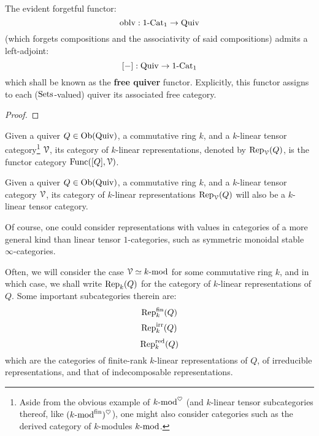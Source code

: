            \begin{proposition} \label{prop: free_quivers}
                The evident forgetful functor:
                    $$\oblv: 1\-\Cat_1 \to \Quiv$$
                (which forgets compositions and the associativity of said compositions) admits a left-adjoint:
                    $$[-]: \Quiv \to 1\-\Cat_1$$
                which shall be known as the \textbf{free quiver} functor. Explicitly, this functor assigns to each ($\Sets$-valued) quiver its associated free category.
            \end{proposition}
                \begin{proof}
                    
                \end{proof}
            \begin{definition} \label{def: quiver_representations}
                Given a quiver $Q \in \Ob(\Quiv)$, a commutative ring $k$, and a $k$-linear tensor category\footnote{Aside from the obvious example of $k\mod^{\heart}$ (and $k$-linear tensor subcategories thereof, like $(k\mod^{\fin})^{\heart}$), one might also consider categories such as the derived category of $k$-modules $k\mod$.} $\calV$, its category of $k$-linear representations, denoted by $\Rep_{\calV}(Q)$, is the functor category $\Func([Q], \calV)$.
            \end{definition}
            \begin{remark}
                Given a quiver $Q \in \Ob(\Quiv)$, a commutative ring $k$, and a $k$-linear tensor category $\calV$, its category of $k$-linear representations $\Rep_{\calV}(Q)$ will also be a $k$-linear tensor category.
                
                Of course, one could consider representations with values in categories of a more general kind than linear tensor $1$-categories, such as symmetric monoidal stable $\infty$-categories. 
            \end{remark}
            \begin{convention}
                Often, we will consider the case $\calV \cong k\mod$ for some commutative ring $k$, and in which case, we shall write $\Rep_k(Q)$ for the category of $k$-linear representations of $Q$. Some important subcategories therein are:
                    $$\Rep_k^{\fin}(Q)$$
                    $$\Rep_k^{\irr}(Q)$$
                    $$\Rep_k^{\red}(Q)$$
                which are the categories of finite-rank $k$-linear representations of $Q$, of irreducible representations, and that of indecomposable representations.
            \end{convention}
            
